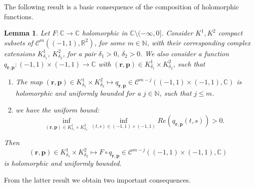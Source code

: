\documentclass{article}
\newtheorem{lemma}[theorem]{Lemma}
\newcommand{\IC}{{\mathbb C}}
\newcommand{\IN}{{\mathbb N}}
\newcommand{\IR}{{\mathbb R}}
\newcommand{\bp}{{\bm p}}
\newcommand{\cmspace}[3]{\mathcal{C}^{#1} \left( #2, #3 \right)}
\newcommand{\br}{\bm{r}}
\begin{document}
The following result is a basic consequence of the composition of holomorphic functions. 

\begin{lemma}
\label{lemma:Fcircq}
Let $F :\IC \rightarrow \IC$ holomorphic in $\IC \setminus (-\infty,0]$. Consider $K^1, K^2$ compact subsets of $\cmspace{m}{(-1,1)}{\IR^2}$, for some $m \in \IN$, with their corresponding complex extensions $K^1_{\delta_1}$, $K^2_{\delta_2}$, for a pair $\delta_1 >0$, $\delta_2>0$. We also consider a function $q_{\br,\bp} :(-1,1)\times (-1,1) \rightarrow \IC$ with $(\br,\bp) \in K^1_{\delta_1} \times K^2_{\delta_2}$, such that  
\begin{enumerate}
\item 
The map $(\br,\bp)  \in K^1_{\delta_1} \times K^2_{\delta_2} \mapsto q_{\br,\bp} \in \cmspace{m-j}{(-1,1)\times(-1,1)}{\IC}$ is holomorphic and uniformly bounded for a $j\in \IN$, such that $j\leq m$. 
\item we have the uniform bound: 
$$
\inf_{(\br,\bp) \in K_{\delta_1}^1 \times K_{\delta_2}^2} \inf_{(t,s) \in (-1,1)\times(-1,1)} Re( q_{\br,\bp}(t,s))>0.
$$
\end{enumerate}
Then 
$$(\br,\bp)  \in K^1_{\delta_1} \times K^2_{\delta_2} \mapsto  F \circ q_{\br,\bp} \in \cmspace{m-j}{(-1,1)\times(-1,1)}{\IC}$$
is holomorphic and uniformly bounded.
\end{lemma} 
From the latter result we obtain two important consequences. 
\end{document}
